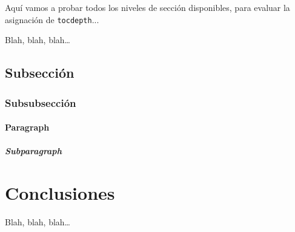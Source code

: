 Aquí vamos a probar todos los niveles de sección disponibles, para
evaluar la asignación de \texttt{tocdepth}...

Blah, blah, blah\ldots


\subsection{Subsección}
\label{sec:subseccion}


\subsubsection{Subsubsección}
\label{sec:subsubseccion}

\paragraph{Paragraph}
\label{sec:paragraph-1}


\subparagraph{Subparagraph}
\label{sec:subparagraph}



\section{Conclusiones}
\label{sec:conclusiones-teoria}

Blah, blah, blah\ldots


